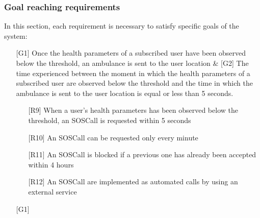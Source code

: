 \subsubsection{Goal reaching requirements}
\par
In this section, each requirement is necessary to satisfy specific goals of the system:
\begin{itemize}
\item[{[G1]}] Once the health parameters of a subscribed user have been observed below the threshold, an ambulance is sent to the user location \& [G2] The time experienced between the moment in which the health parameters of a subscribed user are observed below the threshold and the time in which the ambulance is sent to the user location is equal or less than 5 seconds. 
\begin{itemize}
\item[{[R9]}] When a user's health parameters has been observed below the threshold, an SOSCall is requested within 5 seconds
\item[{[R10]}] An SOSCall can be requested only every minute
\item[{[R11]}] An SOSCall is blocked if a previous one has already been accepted within 4 hours 
\item[{[R12]}] An SOSCall are implemented as automated calls by using an external service
\end{itemize}
\item[{[G1]}] 
\end{itemize}